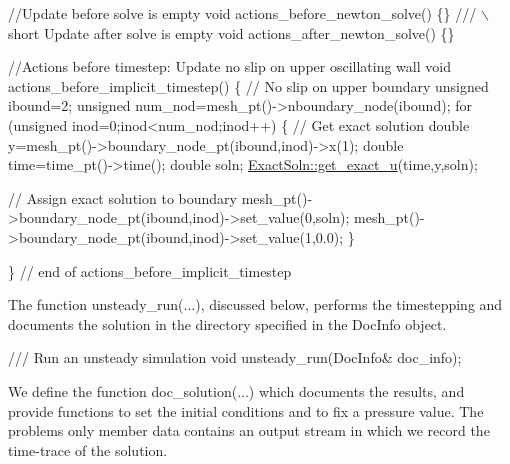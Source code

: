\begin{DoxyCodeInclude}

 \textcolor{comment}{//Update before solve is empty}
 \textcolor{keywordtype}{void} actions\_before\_newton\_solve() \{\}
\textcolor{comment}{}
\textcolor{comment}{ /// \(\backslash\)short Update after solve is empty}
\textcolor{comment}{} \textcolor{keywordtype}{void} actions\_after\_newton\_solve() \{\}

 \textcolor{comment}{//Actions before timestep: Update no slip on upper oscillating wall}
 \textcolor{keywordtype}{void} actions\_before\_implicit\_timestep()
  \{
   \textcolor{comment}{// No slip on upper boundary}
   \textcolor{keywordtype}{unsigned} ibound=2;
   \textcolor{keywordtype}{unsigned} num\_nod=mesh\_pt()->nboundary\_node(ibound);
   \textcolor{keywordflow}{for} (\textcolor{keywordtype}{unsigned} inod=0;inod<num\_nod;inod++)
    \{
     \textcolor{comment}{// Get exact solution}
     \textcolor{keywordtype}{double} y=mesh\_pt()->boundary\_node\_pt(ibound,inod)->x(1);
     \textcolor{keywordtype}{double} time=time\_pt()->time();
     \textcolor{keywordtype}{double} soln;
     \hyperlink{namespaceExactSoln_a2598550281dd62f4160edb3d0b2e5432}{ExactSoln::get\_exact\_u}(time,y,soln);
     
     \textcolor{comment}{// Assign exact solution to boundary}
     mesh\_pt()->boundary\_node\_pt(ibound,inod)->set\_value(0,soln);
     mesh\_pt()->boundary\_node\_pt(ibound,inod)->set\_value(1,0.0);
    \}

  \} \textcolor{comment}{// end of actions\_before\_implicit\_timestep}

\end{DoxyCodeInclude}


The function {\ttfamily unsteady\+\_\+run}(...), discussed below, performs the timestepping and documents the solution in the directory specified in the {\ttfamily Doc\+Info} object.


\begin{DoxyCodeInclude}
   \textcolor{comment}{}
\textcolor{comment}{ /// Run an unsteady simulation}
\textcolor{comment}{} \textcolor{keywordtype}{void} unsteady\_run(DocInfo& doc\_info); 

\end{DoxyCodeInclude}


We define the function {\ttfamily doc\+\_\+solution}(...) which documents the results, and provide functions to set the initial conditions and to fix a pressure value. The problem\textquotesingle{}s only member data contains an output stream in which we record the time-\/trace of the solution.


